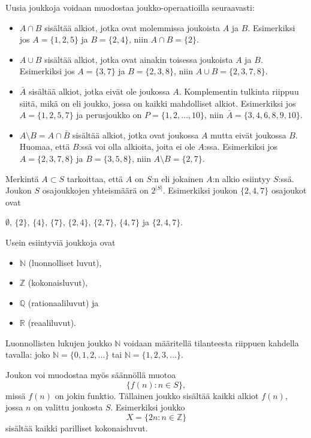 \begin{samepage}
Uusia joukkoja voidaan muodostaa joukko-operaatioilla
seuraavasti:
\begin{itemize}
\item {} $A \cap B$ sisältää alkiot,
jotka ovat molemmissa joukoista $A$ ja $B$.
Esimerkiksi jos $A=\{1,2,5\}$ ja $B=\{2,4\}$,
niin $A \cap B = \{2\}$.
\item {} $A \cup B$ sisältää alkiot,
jotka ovat ainakin toisessa joukoista $A$ ja $B$.
Esimerkiksi jos $A=\{3,7\}$ ja $B=\{2,3,8\}$,
niin $A \cup B = \{2,3,7,8\}$.
\item {} $\bar A$ sisältää alkiot,
jotka eivät ole joukossa $A$.
Komplementin tulkinta riippuu siitä, mikä on
 eli joukko, jossa on kaikki
mahdolliset alkiot. Esimerkiksi jos
$A=\{1,2,5,7\}$ ja perusjoukko on $P=\{1,2,\ldots,10\}$,
niin $\bar A = \{3,4,6,8,9,10\}$.
\item {} $A \setminus B = A \cap \bar B$ sisältää alkiot,
jotka ovat joukossa $A$ mutta eivät joukossa $B$.
Huomaa, että $B$:ssä voi olla alkioita,
joita ei ole $A$:ssa.
Esimerkiksi jos $A=\{2,3,7,8\}$ ja $B=\{3,5,8\}$,
niin $A \setminus B = \{2,7\}$.
\end{itemize}
\end{samepage}


Merkintä $A \subset S$ tarkoittaa,
että $A$ on $S$:n 
eli jokainen $A$:n alkio esiintyy $S$:ssä.
Joukon $S$ osajoukkojen yhteismäärä on $2^{|S|}$.
Esimerkiksi joukon $\{2,4,7\}$
osajoukot ovat
\begin{center}
$\emptyset$,
$\{2\}$, $\{4\}$, $\{7\}$, $\{2,4\}$, $\{2,7\}$, $\{4,7\}$ ja $\{2,4,7\}$.
\end{center}

Usein esiintyviä joukkoja ovat

\begin{itemize}[noitemsep]
\item $\mathbb{N}$ (luonnolliset luvut),
\item $\mathbb{Z}$ (kokonaisluvut),
\item $\mathbb{Q}$ (rationaaliluvut) ja
\item $\mathbb{R}$ (reaaliluvut).
\end{itemize}

Luonnollisten lukujen joukko $\mathbb{N}$ voidaan määritellä
tilanteesta riippuen kahdella tavalla:
joko $\mathbb{N}=\{0,1,2,\ldots\}$
tai $\mathbb{N}=\{1,2,3,...\}$.

Joukon voi muodostaa myös säännöllä muotoa
\[\{f(n) : n \in S\},\]
missä $f(n)$ on jokin funktio.
Tällainen joukko sisältää kaikki alkiot
$f(n)$, jossa $n$ on valittu joukosta $S$.
Esimerkiksi joukko
\[X=\{2n : n \in \mathbb{Z}\}\]
sisältää kaikki parilliset kokonaisluvut.

